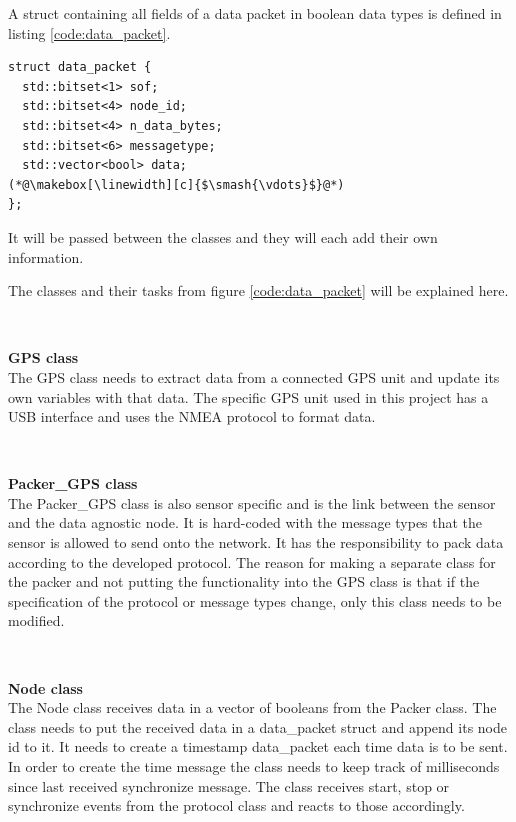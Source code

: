 A struct containing all fields of a data packet in boolean data types is defined in listing \ref{code:data_packet}.  

\begin{lstlisting}[caption=Struct for data packet.,label=code:data_packet]
struct data_packet {
  std::bitset<1> sof;
  std::bitset<4> node_id;
  std::bitset<4> n_data_bytes;
  std::bitset<6> messagetype;
  std::vector<bool> data;
(*@\makebox[\linewidth][c]{$\smash{\vdots}$}@*)
};
\end{lstlisting}
It will be passed between the classes and they will each add their own information. 

The classes and their tasks from figure \ref{code:data_packet} will be explained here.

~\\ \par \textbf{GPS class} ~ \\
The GPS class needs to extract data from a connected GPS unit and update its own variables with that data.
The specific GPS unit used in this project has a USB interface and uses the NMEA protocol to format data.

~\\ \par \textbf{Packer\_GPS class} ~ \\
The Packer\_GPS class is also sensor specific and is the link between the sensor and the data agnostic node.
It is hard-coded with the message types that the sensor is allowed to send onto the network.
It has the responsibility to pack data according to the developed protocol.
The reason for making a separate class for the packer and not putting the functionality into the GPS class is that if the specification of the protocol or message types change, only this class needs to be modified.

~\\ \par \textbf{Node class} ~ \\
The Node class receives data in a vector of booleans from the Packer class.
The class needs to put the received data in a data\_packet struct and append its node id to it.
It needs to create a timestamp data\_packet each time data is to be sent.
In order to create the time message the class needs to keep track of milliseconds since last received synchronize message.
The class receives start, stop or synchronize events from the protocol class and reacts to those accordingly.


